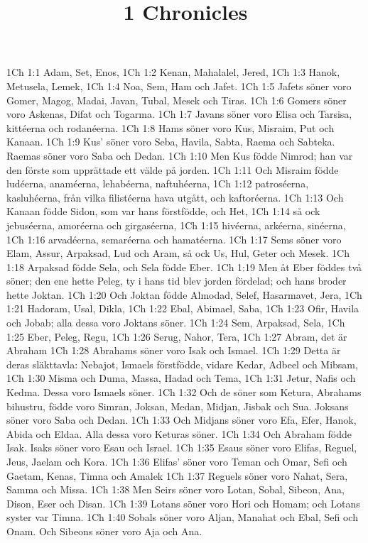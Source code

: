 

\title{1 Chronicles}

1Ch 1:1  Adam, Set, Enos,
1Ch 1:2  Kenan, Mahalalel, Jered,
1Ch 1:3  Hanok, Metusela, Lemek,
1Ch 1:4  Noa, Sem, Ham och Jafet.
1Ch 1:5  Jafets söner voro Gomer, Magog, Madai, Javan, Tubal, Mesek och Tiras.
1Ch 1:6  Gomers söner voro Askenas, Difat och Togarma.
1Ch 1:7  Javans söner voro Elisa och Tarsisa, kittéerna och rodanéerna.
1Ch 1:8  Hams söner voro Kus, Misraim, Put och Kanaan.
1Ch 1:9  Kus' söner voro Seba, Havila, Sabta, Raema och Sabteka. Raemas söner voro Saba och Dedan.
1Ch 1:10  Men Kus födde Nimrod; han var den förste som upprättade ett välde på jorden.
1Ch 1:11  Och Misraim födde ludéerna, anaméerna, lehabéerna, naftuhéerna,
1Ch 1:12  patroséerna, kasluhéerna, från vilka filistéerna hava utgått, och kaftoréerna.
1Ch 1:13  Och Kanaan födde Sidon, som var hans förstfödde, och Het,
1Ch 1:14  så ock jebuséerna, amoréerna och girgaséerna,
1Ch 1:15  hivéerna, arkéerna, sinéerna,
1Ch 1:16  arvadéerna, semaréerna och hamatéerna.
1Ch 1:17  Sems söner voro Elam, Assur, Arpaksad, Lud och Aram, så ock Us, Hul, Geter och Mesek.
1Ch 1:18  Arpaksad födde Sela, och Sela födde Eber.
1Ch 1:19  Men åt Eber föddes två söner; den ene hette Peleg, ty i hans tid blev jorden fördelad; och hans broder hette Joktan.
1Ch 1:20  Och Joktan födde Almodad, Selef, Hasarmavet, Jera,
1Ch 1:21  Hadoram, Usal, Dikla,
1Ch 1:22  Ebal, Abimael, Saba,
1Ch 1:23  Ofir, Havila och Jobab; alla dessa voro Joktans söner.
1Ch 1:24  Sem, Arpaksad, Sela,
1Ch 1:25  Eber, Peleg, Regu,
1Ch 1:26  Serug, Nahor, Tera,
1Ch 1:27  Abram, det är Abraham
1Ch 1:28  Abrahams söner voro Isak och Ismael.
1Ch 1:29  Detta är deras släkttavla: Nebajot, Ismaels förstfödde, vidare Kedar, Adbeel och Mibsam,
1Ch 1:30  Misma och Duma, Massa, Hadad och Tema,
1Ch 1:31  Jetur, Nafis och Kedma. Dessa voro Ismaels söner.
1Ch 1:32  Och de söner som Ketura, Abrahams bihustru, födde voro Simran, Joksan, Medan, Midjan, Jisbak och Sua. Joksans söner voro Saba och Dedan.
1Ch 1:33  Och Midjans söner voro Efa, Efer, Hanok, Abida och Eldaa. Alla dessa voro Keturas söner.
1Ch 1:34  Och Abraham födde Isak. Isaks söner voro Esau och Israel.
1Ch 1:35  Esaus söner voro Elifas, Reguel, Jeus, Jaelam och Kora.
1Ch 1:36  Elifas' söner voro Teman och Omar, Sefi och Gaetam, Kenas, Timna och Amalek
1Ch 1:37  Reguels söner voro Nahat, Sera, Samma och Missa.
1Ch 1:38  Men Seirs söner voro Lotan, Sobal, Sibeon, Ana, Dison, Eser och Disan.
1Ch 1:39  Lotans söner voro Hori och Homam; och Lotans syster var Timna.
1Ch 1:40  Sobals söner voro Aljan, Manahat och Ebal, Sefi och Onam. Och Sibeons söner voro Aja och Ana.
